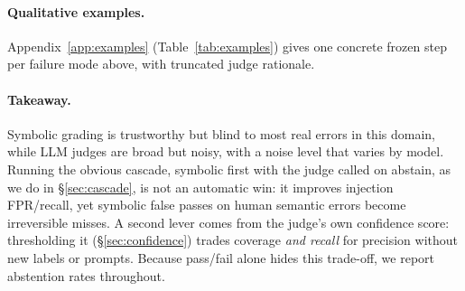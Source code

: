 \paragraph{Qualitative examples.}
Appendix~\ref{app:examples} (Table~\ref{tab:examples}) gives one concrete
frozen step per failure mode above, with truncated judge rationale.

\paragraph{Takeaway.}
Symbolic grading is trustworthy but blind to most real errors in this domain,
while LLM judges are broad but noisy, with a noise level that varies by model.
Running the obvious cascade, symbolic first with the judge called on abstain,
as we do in \S\ref{sec:cascade}, is not an automatic win: it improves injection
FPR/recall, yet symbolic false passes on human semantic errors become
irreversible misses. A second lever comes from the judge's own confidence
score: thresholding it (\S\ref{sec:confidence}) trades coverage \emph{and
recall} for precision without new labels or prompts. Because pass/fail alone
hides this trade-off, we report abstention rates throughout.
